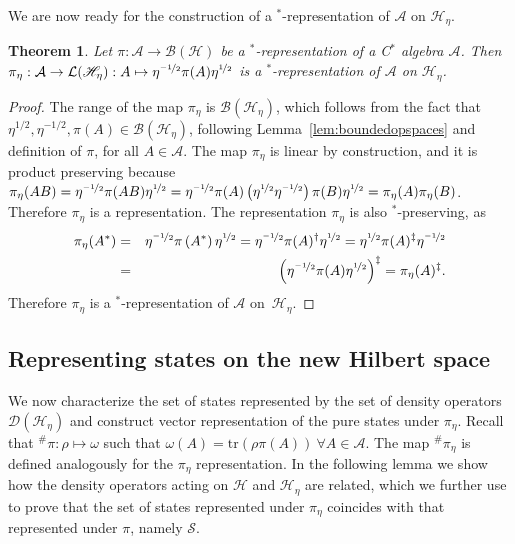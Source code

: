 \documentclass[amsmath,amssymb,aps,pra,superscriptaddress,twocolumn]{revtex4-2}
\newtheorem{theorem}{Theorem}
\begin{document}
\begin{appendix}
We are now ready for the construction of a ${}^*$-representation of $\mathcal{A}$ on $\mathscr{H}_\eta$.
\begin{theorem}
\label{lem:pieta}
Let $\pi:\mathcal{A} \to \mathcal{B}(\mathscr{H})$ be a ${}^*$-representation of a C${}^*$ algebra $\mathcal{A}$.
Then $\pi_{\eta}: \mathcal{A} \to \mathcal{L}(\mathscr{H}_\eta): A\mapsto \eta^{\nicefrac{-1}{2}}\pi(A) \eta^{\nicefrac{1}{2}} $
is a ${}^*$-representation of $\mathcal{A}$ on $\mathscr{H}_\eta$.
\end{theorem}
\begin{proof}
The range of the map $\pi_{\eta}$ is $\mathcal{B}(\mathscr{H}_\eta)$, which follows from the fact that 
 $\eta^{1/2},\eta^{-1/2}, \pi(A) \in \mathcal{B}\left(\mathscr{H}_\eta\right)$, following Lemma~\ref{lem:boundedopspaces}
 and definition of $\pi$, for all $A\in\mathcal{A}$. 
The map $\pi_{\eta}$ is linear by construction, and it is product preserving
because $\pi_{\eta}(AB) = \eta^{\nicefrac{-1}{2}}\pi(AB)\eta^{\nicefrac{1}{2}} = \eta^{\nicefrac{-1}{2}}\pi(A)\left(\eta^{\nicefrac{1}{2}}\eta^{\nicefrac{-1}{2}}\right)\pi(B)\eta^{\nicefrac{1}{2}} = \pi_{\eta}(A)\pi_{\eta}(B)$. Therefore $\pi_\eta$ is a representation. 
The representation $\pi_{\eta}$ is also ${}^{*}$-preserving, as 
\begin{eqnarray}
    \pi_{\eta}(A^*) &=& \eta^{\nicefrac{-1}{2}}\pi\left(A^*\right)\eta^{\nicefrac{1}{2}} = \eta^{\nicefrac{-1}{2}}\pi(A)^\dagger \eta^{\nicefrac{1}{2}} 
    = \eta^{\nicefrac{1}{2}}\pi(A)^\ddagger \eta^{\nicefrac{-1}{2}} \nonumber \\
    &=&\left(\eta^{\nicefrac{-1}{2}}\pi(A) \eta^{\nicefrac{1}{2}}\right)^\ddagger = \pi_{\eta}(A)^\ddagger.  
\end{eqnarray}
Therefore $\pi_{\eta}$ is a  ${}^{*}$-representation of $\mathcal{A}$ on~$\mathscr{H}_\eta$.
\end{proof}


\subsection{Representing states on the new Hilbert space}
\label{sec:liftmap}
We now characterize the set of states represented by the set of density operators~$\mathcal{D}\left(\mathscr{H}_\eta\right)$
and construct vector representation of the pure states under $\pi_\eta$.
Recall that ${}^{\#}\pi:\rho \mapsto \omega$ such that $\omega(A) = \text{tr}(\rho \pi(A))\  \forall A \in \mathcal{A}$. 
The map ${}^{\#}\pi_\eta$ is defined analogously for the $\pi_\eta$ representation. 
In the following lemma
we show how the density operators acting on $\mathscr{H}$ and $\mathscr{H}_\eta$ are related,
which we further use to prove that the set of states represented under 
$\pi_\eta$ coincides with that represented under $\pi$, namely $\mathcal{S}$. 



\end{appendix}
\end{document}
